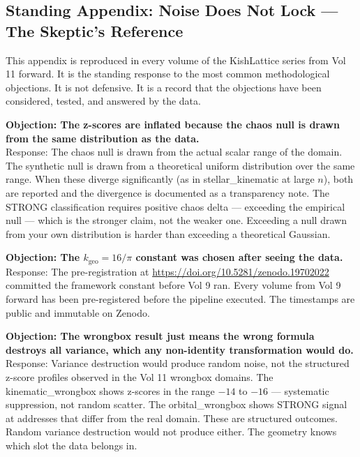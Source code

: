 \documentclass[11pt, letterpaper, openany]{book}
\begin{document}
\begin{empiricalbox}
\clearpage

\chapter*{Standing Appendix: Noise Does Not Lock --- The Skeptic's Reference}

This appendix is reproduced in every volume of the KishLattice series from
Vol 11 forward. It is the standing response to the most common methodological
objections. It is not defensive. It is a record that the objections have been
considered, tested, and answered by the data.

\begin{fieldbox}
\textbf{Objection: The z-scores are inflated because the chaos null
is drawn from the same distribution as the data.}\\[0.5em]
Response: The chaos null is drawn from the actual scalar range of the domain.
The synthetic null is drawn from a theoretical uniform distribution over the
same range. When these diverge significantly (as in stellar\_kinematic at
large $n$), both are reported and the divergence is documented as a
transparency note. The STRONG classification requires positive chaos delta ---
exceeding the empirical null --- which is the stronger claim, not the weaker one.
Exceeding a null drawn from your own distribution is harder than exceeding
a theoretical Gaussian.
\end{fieldbox}

\begin{fieldbox}
\textbf{Objection: The $k_\text{geo} = 16/\pi$ constant was chosen
after seeing the data.}\\[0.5em]
Response: The pre-registration at \url{https://doi.org/10.5281/zenodo.19702022}
committed the framework constant before Vol 9 ran. Every volume from Vol 9
forward has been pre-registered before the pipeline executed. The timestamps
are public and immutable on Zenodo.
\end{fieldbox}

\begin{fieldbox}
\textbf{Objection: The wrongbox result just means the wrong formula
destroys all variance, which any non-identity transformation would do.}\\[0.5em]
Response: Variance destruction would produce random noise, not the
structured z-score profiles observed in the Vol 11 wrongbox domains.
The kinematic\_wrongbox shows z-scores in the range $-14$ to $-16$ ---
systematic suppression, not random scatter. The orbital\_wrongbox shows
STRONG signal at addresses that differ from the real domain. These are
structured outcomes. Random variance destruction would not produce either.
The geometry knows which slot the data belongs in.
\end{fieldbox}


\end{empiricalbox}
\end{document}
